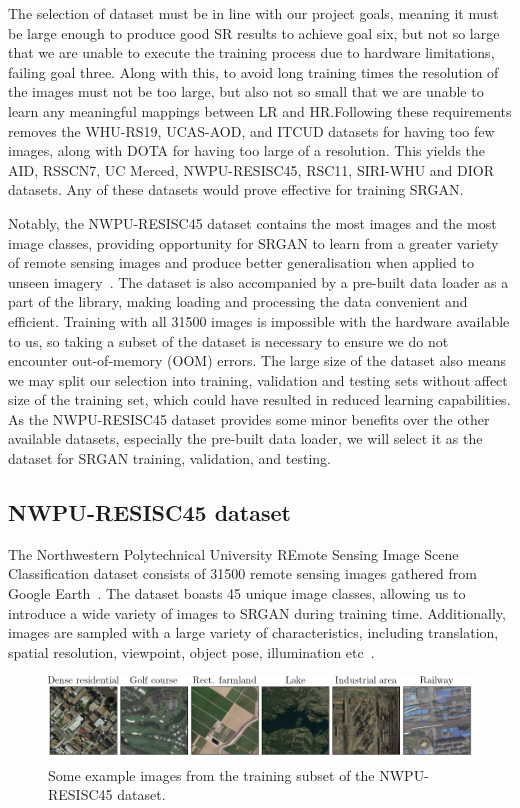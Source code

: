 The selection of dataset must be in line with our project goals, meaning it must be large enough to produce good SR results to achieve goal six, but not so large that we are unable to execute the training process due to hardware limitations, failing goal three. Along with this, to avoid long training times the resolution of the images must not be too large, but also not so small that we are unable to learn any meaningful mappings between LR and HR.\@  Following these requirements removes the WHU-RS19, UCAS-AOD, and ITCUD datasets for having too few images, along with DOTA for having too large of a resolution. This yields the AID, RSSCN7, UC Merced, NWPU-RESISC45, RSC11, SIRI-WHU and DIOR datasets. Any of these datasets would prove effective for training SRGAN.\@

Notably, the NWPU-RESISC45 dataset contains the most images and the most image classes, providing opportunity for SRGAN to learn from a greater variety of remote sensing images and produce better generalisation when applied to unseen imagery~\cite{resisc45}. The dataset is also accompanied by a pre-built data loader as a part of the   library, making loading and processing the data convenient and efficient. Training with all 31500 images is impossible with the hardware available to us, so taking a subset of the dataset is necessary to ensure we do not encounter out-of-memory (OOM) errors. The large size of the dataset also means we may split our selection into training, validation and testing sets without affect size of the training set, which could have resulted in reduced learning capabilities. As the NWPU-RESISC45 dataset provides some minor benefits over the other available datasets, especially the pre-built data loader, we will select it as the dataset for SRGAN training, validation, and testing. 

\subsection{NWPU-RESISC45 dataset}\label{subsec:resisc45}
The Northwestern Polytechnical University REmote Sensing Image Scene Classification dataset consists of 31500 remote sensing images gathered from Google Earth~\cite{resisc45}. The dataset boasts 45 unique image classes, allowing us to introduce a wide variety of images to SRGAN during training time. Additionally, images are sampled with a large variety of characteristics, including translation, spatial resolution, viewpoint, object pose, illumination etc~\cite{resisc45}.
\begin{figure}[b]
    \includegraphics[width=\linewidth]{./assets/resisc45_example.png}
    \caption{Some example images from the training subset of the NWPU-RESISC45 dataset.}
    \label{fig:resisc45_examples}
\end{figure}

